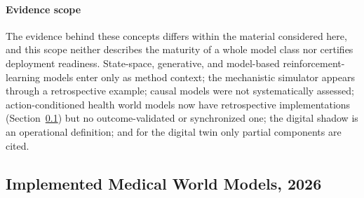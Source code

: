 \documentclass[journal]{IEEEtran}
\begin{document}
\paragraph{Evidence scope} The evidence behind these concepts differs within the material considered here, and this scope neither describes the maturity of a whole model class nor certifies deployment readiness. State-space, generative, and model-based reinforcement-learning models enter only as method context; the mechanistic simulator appears through a retrospective example; causal models were not systematically assessed; action-conditioned health world models now have retrospective implementations (Section~\ref{sec:recentwm}) but no outcome-validated or synchronized one; the digital shadow is an operational definition; and for the digital twin only partial components are cited.

\subsection{Implemented Medical World Models, 2026}
\label{sec:recentwm}
\end{document}
